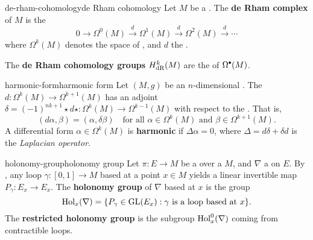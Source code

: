     

\begin{topic}{de-rham-cohomology}{de Rham cohomology}
    Let $M$ be a . The \textbf{de Rham complex} of $M$ is the 
    \[ 0 \to \Omega^0(M) \xrightarrow{d} \Omega^1(M) \xrightarrow{d} \Omega^2(M) \xrightarrow{d} \cdots \]
    where $\Omega^k(M)$ denotes the space of , and $d$ the .
    
    The \textbf{de Rham cohomology groups} $H_\textup{dR}^k(M)$ are the  of $\Omega^\bdot(M)$.
\end{topic}

\begin{topic}{harmonic-form}{harmonic form}
    Let $(M, g)$ be an $n$-dimensional . The  $d \colon \Omega^k(M) \to \Omega^{k + 1}(M)$ has an adjoint $\delta = (-1)^{nk + 1} \star d \star \colon \Omega^k(M) \to \Omega^{k - 1}(M)$ with respect to the . That is,
    \[ (d \alpha, \beta) = (\alpha, \delta \beta) \quad \text{for all } \alpha \in \Omega^k(M) \text{ and } \beta \in \Omega^{k + 1}(M) . \]
    A differential form $\alpha \in \Omega^k(M)$ is \textbf{harmonic} if $\Delta \alpha = 0$, where $\Delta = d \delta + \delta d$ is the \textit{Laplacian operator}.
\end{topic}

\begin{topic}{holonomy-group}{holonomy group}
    Let $\pi \colon E \to M$ be a  over a  $M$, and $\nabla$ a  on $E$. By , any loop $\gamma \colon [0, 1] \to M$ based at a point $x \in M$ yields a linear invertible map $P_\gamma \colon E_x \to E_x$. The \textbf{holonomy group} of $\nabla$ based at $x$ is the group
    \[ \textup{Hol}_x(\nabla) = \{ P_\gamma \in \textup{GL}(E_x) : \gamma \text{ is a loop based at } x \} . \]
    The \textbf{restricted holonomy group} is the subgroup $\textup{Hol}_x^0(\nabla)$ coming from contractible loops.
\end{topic}

